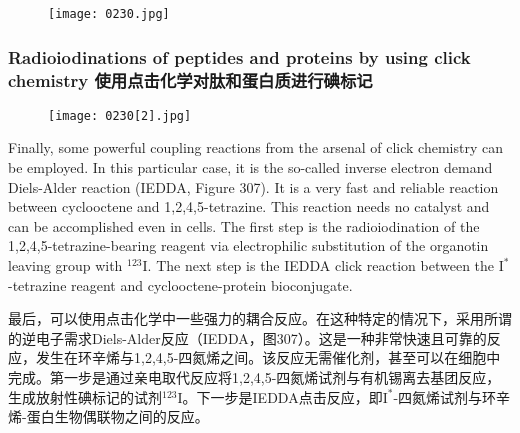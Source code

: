 \documentclass[dvipsnames, svgnames,a4paper,11pt]{article}
\begin{document}
\begin{figure}[h]
	\centering
    \texttt{[image: 0230.jpg]}  
     \label{fig306}
\end{figure}


\subsubsection{Radioiodinations of peptides and proteins by using click chemistry 使用点击化学对肽和蛋白质进行碘标记}

\begin{figure}[h]
	\centering
    \texttt{[image: 0230[2].jpg]}  
     \label{fig307}
\end{figure}
Finally, some powerful coupling reactions from the arsenal of click chemistry can be employed. In this particular case, it is the so-called inverse electron demand Diels-Alder reaction (IEDDA, Figure 307). It is a very fast and reliable reaction between cyclooctene and 1,2,4,5-tetrazine. This reaction needs no catalyst and can be accomplished even in cells. The first step is the radioiodination of the 1,2,4,5-tetrazine-bearing reagent via electrophilic substitution of the organotin leaving group with \(\mathrm{^{123}I}\). The next step is the IEDDA click reaction between the \(\mathrm{I^{*}}\)-tetrazine reagent and cyclooctene-protein bioconjugate.

最后，可以使用点击化学中一些强力的耦合反应。在这种特定的情况下，采用所谓的逆电子需求Diels-Alder反应（IEDDA，图307）。这是一种非常快速且可靠的反应，发生在环辛烯与1,2,4,5-四氮烯之间。该反应无需催化剂，甚至可以在细胞中完成。第一步是通过亲电取代反应将1,2,4,5-四氮烯试剂与有机锡离去基团反应，生成放射性碘标记的试剂\(\mathrm{^{123}I}\)。下一步是IEDDA点击反应，即\(\mathrm{I^{*}}\)-四氮烯试剂与环辛烯-蛋白生物偶联物之间的反应。
\end{document}
